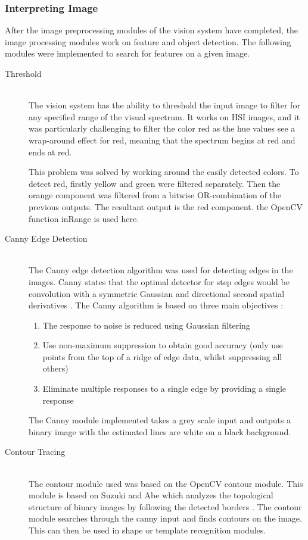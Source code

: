 \subsubsection{Interpreting Image} 
After the image preprocessing modules of the vision system have completed, the image processing modules work on feature and object detection. The following modules were implemented to search for features on a given image. 
\begin{description}
\item[Threshold]\hfill \\
The vision system has the ability to threshold the input image to filter for any specified range of the visual spectrum. 
It works on HSI images, and it was particularly challenging to filter the color red as the hue values see a wrap-around effect for red, meaning that the spectrum begins at red and ends at red.

This problem was solved by working around the easily detected colors. To detect red, firstly yellow and green were filtered separately. Then the orange component was filtered from a bitwise OR-combination of the previous outputs. The resultant output is the red component.
the OpenCV function inRange is used here.

\item[Canny Edge Detection]\hfill \\
The Canny edge detection algorithm \cite{Canny:1986:CAE:11274.11275}  was used for detecting edges in the images. Canny states that the optimal detector for step edges would be convolution with a symmetric Gaussian and directional second spatial derivatives \cite{books/sp/Cipolla96}. The Canny algorithm is based on three main objectives \cite{Nixon:2008:FEI:1571711}:
\begin{enumerate}
  \item The response to noise is reduced using Gaussian filtering
  \item Use non-maximum suppression to obtain good accuracy (only use points from the top of a ridge of edge data, whilst suppressing all others)
  \item Eliminate multiple responses to a single edge by providing a single response
\end{enumerate}

The Canny module implemented takes a grey scale input and outputs a binary image with the estimated lines are white on a black background.

\item[Contour Tracing]\hfill \\
The contour module used was based on the OpenCV contour module. This module is based on Suzuki and Abe which analyzes the topological structure of binary
images by following the detected borders \cite{article:suzuki}. 
The contour module searches through the canny input and finds contours on the image. This can then be used in shape or template recognition modules.


\end{description}
